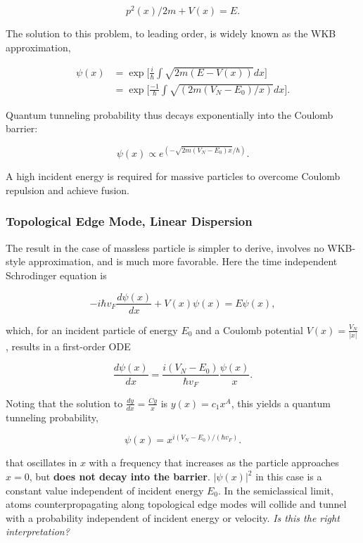 \documentclass[onecolumn,
               superscriptaddress,
               floatfix,
               longbibliography, 
               showkeys,apl]{revtex4-2}
\begin{document}
\begin{appendices}
\begin{equation}
p^2(x)/2m +V(x) = E.
\end{equation}

The solution to this problem, to leading order, is widely known as the WKB approximation,

\begin{equation}
\begin{split}
    \psi(x) &= \exp \big[\frac{i}{\hbar}\int\sqrt{2m(E-V(x))}dx \big] \\ &= \exp \big[ \frac{-1}{\hbar}\int\sqrt{(2m(V_N-E_0)/x)}dx \big].
\end{split}
\end{equation}

Quantum tunneling probability thus decays exponentially into the Coulomb barrier:

\begin{equation}
    \boxed{\psi(x) \propto e^{(-\sqrt{2m(V_N-E_0)x}/\hbar)}}.
\end{equation}

A high incident energy is required for massive particles to overcome Coulomb repulsion and achieve fusion.

\subsubsection{Topological Edge Mode, Linear Dispersion}

The result in the case of massless particle is simpler to derive, involves no WKB-style approximation, and is much more favorable. Here the time independent Schrodinger equation is

\begin{equation}
    -i\hbar v_F \frac{d\psi(x)}{dx} + V(x)\psi(x) = E\psi(x),
\end{equation}

which, for an incident particle of energy $E_0$ and a Coulomb potential $V(x)=\frac{V_N}{|x|}$, results in a first-order ODE

\begin{equation}
    \frac{d\psi(x)}{dx} = \frac{i(V_N-E_0)}{\hbar v_F}\frac{\psi(x)}{x}.
\end{equation}

Noting that the solution to $\frac{dy}{dx}=\frac{Cy}{x}$ is $y(x)=c_1x^{A}$, this yields a quantum tunneling probability,

\begin{equation}
    \boxed{\psi(x) = x^{i(V_N-E_0)/(\hbar v_F)}}.
\end{equation}

that oscillates in $x$ with a frequency that increases as the particle approaches $x=0$, but \textbf{does not decay into the barrier}. $|\psi(x)|^2$ in this case is a constant value independent of incident energy $E_0$. In the semiclassical limit, atoms counterpropagating along topological edge modes will collide and tunnel with a probability independent of incident energy or velocity. \textit{Is this the right interpretation?}

\end{appendices}
\end{document}
